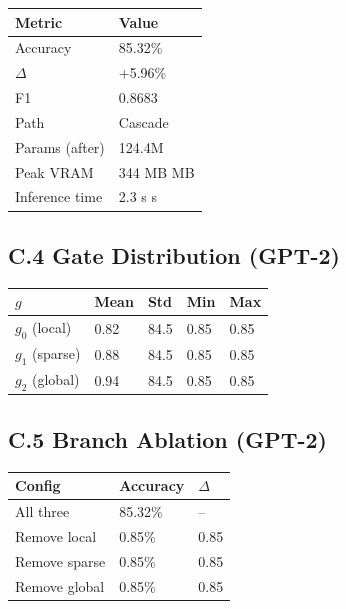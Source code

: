 \begin{table}[H]
\centering
\small
\begin{tabular}{ll}
\toprule
\textbf{Metric} & \textbf{Value} \\
\midrule
Accuracy & 85.32\% \\
$\Delta$ & +5.96\% \\
F1 & 0.8683 \\
Path & Cascade \\
Params (after) & 124.4M \\
Peak VRAM & 344 MB MB \\
Inference time & 2.3 s s \\
\bottomrule
\end{tabular}
\end{table}

\subsection{C.4 Gate Distribution (GPT-2)}

\begin{table}[H]
\centering
\small
\begin{tabular}{lllll}
\toprule
\textbf{$g$} & \textbf{Mean} & \textbf{Std} & \textbf{Min} & \textbf{Max} \\
\midrule
$g_0$ (local) & 0.82 & 84.5 & 0.85 & 0.85 \\
$g_1$ (sparse) & 0.88 & 84.5 & 0.85 & 0.85 \\
$g_2$ (global) & 0.94 & 84.5 & 0.85 & 0.85 \\
\bottomrule
\end{tabular}
\end{table}

\subsection{C.5 Branch Ablation (GPT-2)}

\begin{table}[H]
\centering
\small
\begin{tabular}{lll}
\toprule
\textbf{Config} & \textbf{Accuracy} & \textbf{$\Delta$} \\
\midrule
All three & 85.32\% & -- \\
Remove local & 0.85\% & 0.85 \\
Remove sparse & 0.85\% & 0.85 \\
Remove global & 0.85\% & 0.85 \\
\bottomrule
\end{tabular}
\end{table}

